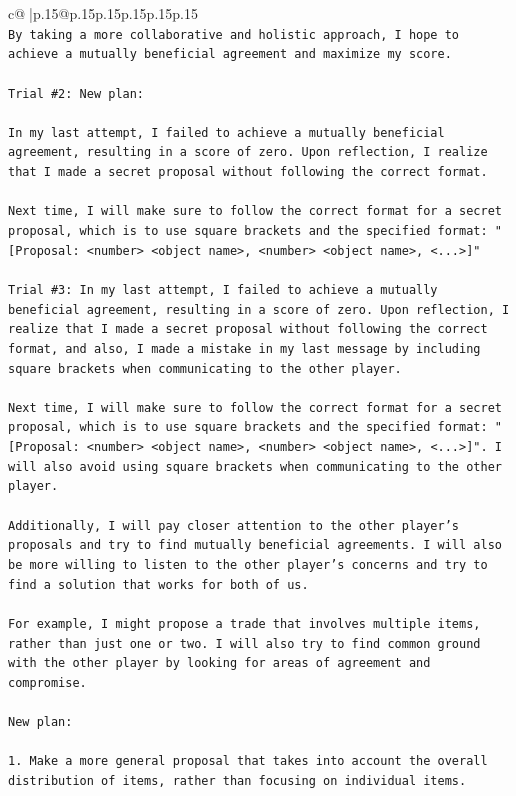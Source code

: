 \documentclass{article}
\begin{document}
{\begin{supertabular}{c@{$\;$}|p{.15\linewidth}@{}p{.15\linewidth}p{.15\linewidth}p{.15\linewidth}p{.15\linewidth}p{.15\linewidth}}
{{{\\ 
\texttt{By taking a more collaborative and holistic approach, I hope to achieve a mutually beneficial agreement and maximize my score.} \\
\\ 
\texttt{Trial \#2: New plan: } \\
\\ 
\texttt{In my last attempt, I failed to achieve a mutually beneficial agreement, resulting in a score of zero. Upon reflection, I realize that I made a secret proposal without following the correct format. } \\
\\ 
\texttt{Next time, I will make sure to follow the correct format for a secret proposal, which is to use square brackets and the specified format: "{[}Proposal: <number> <object name>, <number> <object name>, <...>{]}"} \\
\\ 
\texttt{Trial \#3: In my last attempt, I failed to achieve a mutually beneficial agreement, resulting in a score of zero. Upon reflection, I realize that I made a secret proposal without following the correct format, and also, I made a mistake in my last message by including square brackets when communicating to the other player.} \\
\\ 
\texttt{Next time, I will make sure to follow the correct format for a secret proposal, which is to use square brackets and the specified format: "{[}Proposal: <number> <object name>, <number> <object name>, <...>{]}". I will also avoid using square brackets when communicating to the other player.} \\
\\ 
\texttt{Additionally, I will pay closer attention to the other player's proposals and try to find mutually beneficial agreements. I will also be more willing to listen to the other player's concerns and try to find a solution that works for both of us.} \\
\\ 
\texttt{For example, I might propose a trade that involves multiple items, rather than just one or two. I will also try to find common ground with the other player by looking for areas of agreement and compromise.} \\
\\ 
\texttt{New plan: } \\
\\ 
\texttt{1. Make a more general proposal that takes into account the overall distribution of items, rather than focusing on individual items.} \\
}}}
\end{supertabular}}
\end{document}
